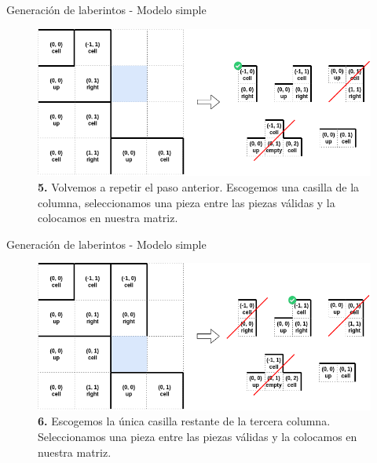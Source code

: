 \documentclass{beamer}
\begin{document}
    \begin{frame}{Generación de laberintos - Modelo simple \scriptsize{\hfill \secname}}
        \begin{figure}[H]
        \centering
            \includegraphics[scale=0.375]{img/paso5.png}
            \caption{\textbf{5.} Volvemos a repetir el paso anterior. Escogemos una casilla de la columna, seleccionamos una pieza entre las piezas válidas y la colocamos en nuestra matriz.}
        \end{figure}
    \end{frame}
    
    \begin{frame}{Generación de laberintos - Modelo simple \scriptsize{\hfill \secname}}
        \begin{figure}[H]
        \centering
            \includegraphics[scale=0.375]{img/paso6.png}
            \caption{\textbf{6.} Escogemos la única casilla restante de la tercera columna. Seleccionamos una pieza entre las piezas válidas y la colocamos en nuestra matriz.}
        \end{figure}
    \end{frame}
    
\end{document}

